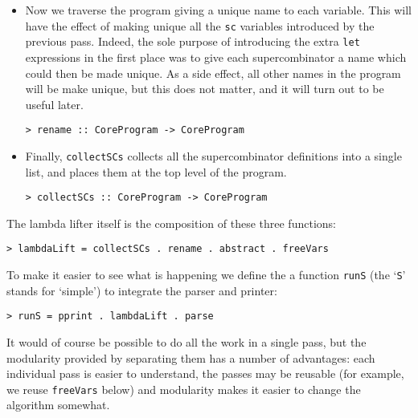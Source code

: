 \begin{itemize}
\item
Now we traverse the program giving a unique name to each variable.
This will have the effect of making unique all the \mbox{\tt sc} variables
introduced by the previous pass.  Indeed, the sole purpose of
introducing the extra \mbox{\tt let} expressions in the first place was to give
each supercombinator a name which could then be made unique.  As a
side effect, all other names in the program will be make unique, but
this does not matter, and it will turn out to be useful later.
\begin{verbatim}
> rename :: CoreProgram -> CoreProgram
\end{verbatim}
%
\item
Finally, \mbox{\tt collectSCs}
collects all the supercombinator definitions into a single list, and
places them at the top level of the program.
\begin{verbatim}
> collectSCs :: CoreProgram -> CoreProgram
\end{verbatim}
%
\end{itemize}

The lambda lifter itself is the composition of these three functions:
\begin{verbatim}
> lambdaLift = collectSCs . rename . abstract . freeVars
\end{verbatim}
%
To make it easier to see what is happening we define the a function \mbox{\tt runS}
(the `\mbox{\tt S}' stands for `simple') to integrate the parser and printer:
\begin{verbatim}
> runS = pprint . lambdaLift . parse
\end{verbatim}
%
It would of course be possible to do all the work in a single pass,
but the modularity provided by separating them has a number of
advantages: each individual pass is easier to understand, the passes
may be reusable (for example, we reuse \mbox{\tt freeVars} below) and
modularity makes it easier to change the algorithm somewhat.

